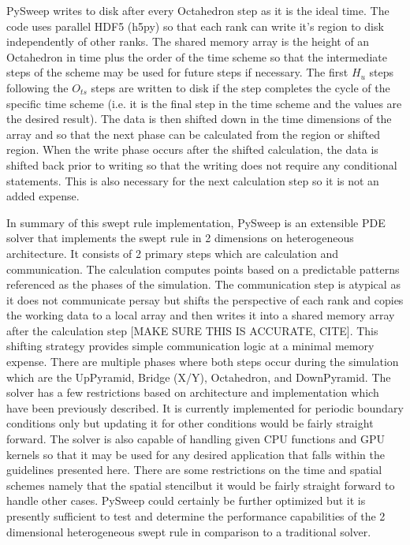 \documentclass[review]{elsarticle}
\begin{document}
\par PySweep writes to disk after every Octahedron step as it is the ideal time. The code uses parallel HDF5 (h5py) so that each rank can write it's region to disk independently of other ranks. The shared memory array is the height of an Octahedron in time plus the order of the time scheme so that the intermediate steps of the scheme may be used for future steps if necessary. The first $H_{u}$ steps following the $O_{ts}$ steps are written to disk if the step completes the cycle of the specific time scheme (i.e. it is the final step in the time scheme and the values are the desired result). The data is then shifted down in the time dimensions of the array and so that the next phase can be calculated from the region or shifted region. When the write phase occurs after the shifted calculation, the data is shifted back prior to writing so that the writing does not require any conditional statements. This is also necessary for the next calculation step so it is not an added expense.

\par In summary of this swept rule implementation, PySweep is an extensible PDE solver that implements the swept rule in 2 dimensions on heterogeneous architecture. It consists of 2 primary steps which are calculation and communication. The calculation computes points based on a predictable patterns referenced as the phases of the simulation. The communication step is atypical as it does not communicate persay but shifts the perspective of each rank and copies the working data to a local array and then writes it into a shared memory array after the calculation step [MAKE SURE THIS IS ACCURATE, CITE]. This shifting strategy provides simple communication logic at a minimal memory expense. There are multiple phases where both steps occur during the simulation which are the UpPyramid, Bridge (X/Y), Octahedron, and DownPyramid. The solver has a few restrictions based on architecture and implementation which have been previously described. It is currently implemented for periodic boundary conditions only but updating it for other conditions would be fairly straight forward. The solver is also capable of handling given CPU functions and GPU kernels so that it may be used for any desired application that falls within the guidelines presented here. There are some restrictions on the time and spatial schemes \emdash namely that the spatial stencil\emdash but it would be fairly straight forward to handle other cases. PySweep could certainly be further optimized but it is presently sufficient to test and determine the performance capabilities of the 2 dimensional heterogeneous swept rule in comparison to a traditional solver.
\end{document}
